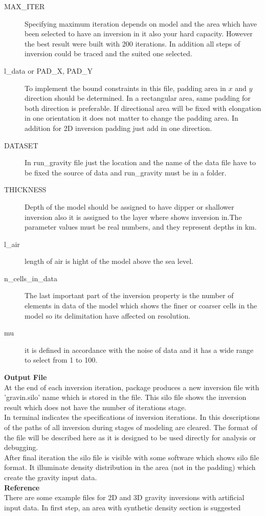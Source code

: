 \begin{description} 	
\item[MAX\_ITER]
Specifying maximum iteration depends on model and the area which have been selected to have an inversion in it also your hard capacity. However the best result were built with 200 iterations. In addition all steps of inversion could be traced and the suited one selected.

\item[l_data or PAD\_X, PAD\_Y] To implement the bound constraints in this file, padding area in $x$ and $y$ direction should be determined. In a rectangular area, same padding for both direction is preferable. If directional area will be fixed with elongation in one orientation it does not matter to change the padding area. In addition for 2D inversion padding just add in one direction.

\item[DATASET] In run_gravity file just the location and the name of the data file have to be fixed the source of data and run_gravity must be in a folder. 

\item[THICKNESS] Depth of the model should be assigned to have dipper or shallower inversion also it is assigned to the layer where shows inversion in.The parameter values must be real numbers, and they represent depths in km.

\item[l_air] length of air is hight of the model above the sea level. 

\item[n_cells_in_data] The last important part of the inversion property is the number of elements in data of the model which shows the finer or coarser cells in the model so its delimitation have affected on resolution.

\item[mu]it is defined in accordance with the noise of data and it has a wide range to select from 1 to 100.

\end{description}

\textbf{Output File}\\

At the end of each inversion iteration, package produces a new inversion file with 'gravin.silo' name which is stored in the file. This silo file shows the inversion result which does not have the number of iterations stage.\\
 In terminal indicates the specifications of inversion iterations. In this descriptions of the paths of all inversion during stages of modeling are cleared. The format of the file will be described here as it is designed to be used directly for analysis or debugging.\\
After final iteration the silo file is visible with some software which shows silo file format. It illuminate density distribution in the area (not in the padding) which create the gravity input data.\\

\textbf{Reference}\\

There are some example files for 2D and 3D gravity inversions with artificial input data.
In first step, an area with synthetic density section is suggested

